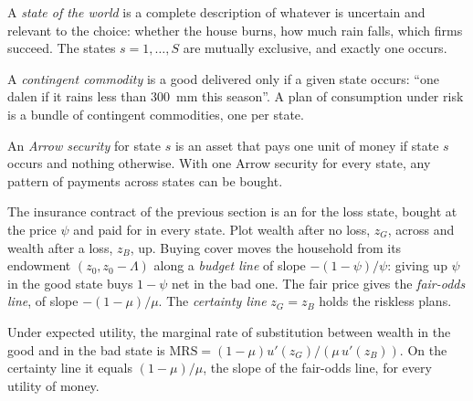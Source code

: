 \begin{definition}\label{def:b2:insurance-and-risk-sharing:state}
A \emph{state of the world} is a complete description of whatever is
uncertain and relevant to the choice: whether the house burns, how much rain falls, which firms
succeed. The states $s = 1, \dots, S$ are mutually exclusive, and exactly one occurs.
\end{definition}

\begin{definition}\label{def:b2:insurance-and-risk-sharing:contingent-commodity}
A \emph{contingent commodity} is a good delivered only if a given state
occurs: ``one dalen if it rains less than \qty{300}{mm} this season''. A plan of consumption under
risk is a bundle of contingent commodities, one per state.
\end{definition}

\begin{definition}\label{def:b2:insurance-and-risk-sharing:arrow-security}
An \emph{Arrow security} for state $s$ is an asset that pays one unit of money
if state $s$ occurs and nothing otherwise. With one Arrow security for every state, any pattern of
payments across states can be bought.
\end{definition}

The insurance contract of the previous section is an  for the loss state, bought at the
price $\psi$ and paid for in every state. Plot wealth after no loss, $z_G$, across and wealth after a
loss, $z_B$, up. Buying cover moves the household from its endowment $(z_0, z_0 - \Lambda)$ along a
\emph{budget line} of slope $-(1 - \psi)/\psi$: giving up $\psi$ in the good state buys $1 - \psi$ net
in the bad one. The fair price gives the \emph{fair-odds line}, of slope $-(1 - \mu)/\mu$. The
\emph{certainty line} $z_G = z_B$ holds the riskless plans.

\begin{proposition}\label{prop:b2:insurance-and-risk-sharing:certainty-line}
Under expected utility, the marginal rate of substitution between wealth in the good and in the bad
state is $\mathrm{MRS} = (1 - \mu)u'(z_G)/(\mu\,u'(z_B))$. On the certainty line it equals $(1 -
\mu)/\mu$, the slope of the fair-odds line, for every utility of money.
\end{proposition}

